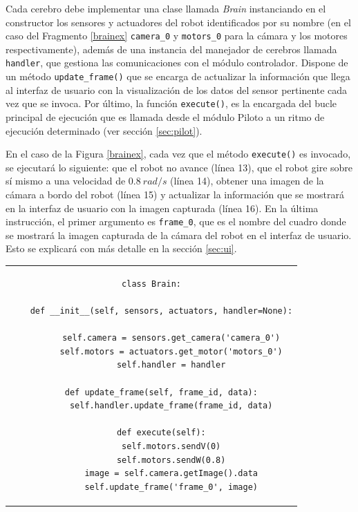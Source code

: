 Cada cerebro debe implementar una clase llamada \textit{Brain} instanciando en el constructor los sensores y actuadores del robot identificados por su nombre (en el caso del Fragmento \ref{brainex} \lstinline{camera_0} y \lstinline{motors_0} para la cámara y los motores respectivamente), además de una instancia del manejador de cerebros llamada \lstinline{handler}, que gestiona las comunicaciones con el módulo controlador. Dispone de un método \lstinline {update_frame()} que se encarga de actualizar la información que llega al interfaz de usuario con la visualización de los datos del sensor pertinente cada vez que se invoca. Por último, la función \lstinline {execute()}, es la encargada del bucle principal de ejecución que es llamada desde el módulo Piloto a un ritmo de ejecución determinado (ver sección \ref{sec:pilot}). 

En el caso de la Figura \ref{brainex}, cada vez que el método \lstinline{execute()} es invocado, se ejecutará lo siguiente: que el robot no avance (línea 13), que el robot gire sobre sí mismo a una velocidad de $0.8\ rad/s$ (línea 14), obtener una imagen de la cámara a bordo del robot (línea 15) y actualizar la información que se mostrará en la interfaz de usuario con la imagen capturada (línea 16). En la última instrucción, el primer argumento es \lstinline{frame_0}, que es el nombre del cuadro donde se mostrará la imagen capturada de la cámara del robot en el interfaz de usuario. Esto se explicará con más detalle en la sección \ref{sec:ui}.

\begin{tabular}{c}
\begin{lstlisting}[caption={Ejemplo de implementación de cerebro no neuronal},label=brainex,style=Python] 
class Brain:
    
    def __init__(self, sensors, actuators, handler=None):
       
        self.camera = sensors.get_camera('camera_0')
        self.motors = actuators.get_motor('motors_0')
        self.handler = handler

    def update_frame(self, frame_id, data):
        self.handler.update_frame(frame_id, data)

    def execute(self):
        self.motors.sendV(0)
        self.motors.sendW(0.8)
        image = self.camera.getImage().data
        self.update_frame('frame_0', image)
\end{lstlisting}
\end{tabular}


